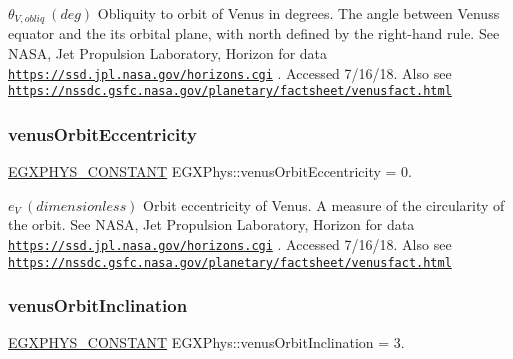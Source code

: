 $ \theta_{V,obliq} \ (deg)$ Obliquity to orbit of Venus in degrees. The angle between Venus\textquotesingle{}s equator and the it\textquotesingle{}s orbital plane, with north defined by the right-\/hand rule. See N\+A\+SA, Jet Propulsion Laboratory, Horizon for data \href{https://ssd.jpl.nasa.gov/horizons.cgi}{\tt https\+://ssd.\+jpl.\+nasa.\+gov/horizons.\+cgi} . Accessed 7/16/18. Also see \href{https://nssdc.gsfc.nasa.gov/planetary/factsheet/venusfact.html}{\tt https\+://nssdc.\+gsfc.\+nasa.\+gov/planetary/factsheet/venusfact.\+html} \mbox{\label{group___e_g_x_phys-_constants-_astrophysics-_solar_system-_venus-_orbit_ga78f2cdfeba6d640c0dceeb7b83c6b238}} 
\subsubsection{\texorpdfstring{venus\+Orbit\+Eccentricity}{venusOrbitEccentricity}}
{\footnotesize\ttfamily \mbox{\hyperlink{group___e_g_x_phys-_constants-_macros_ga76980d288494ce1714c9ac68a95ba702}{E\+G\+X\+P\+H\+Y\+S\+\_\+\+C\+O\+N\+S\+T\+A\+NT}} E\+G\+X\+Phys\+::venus\+Orbit\+Eccentricity = 0.}

$ e_{V} \ (dimensionless)$ Orbit eccentricity of Venus. A measure of the circularity of the orbit. See N\+A\+SA, Jet Propulsion Laboratory, Horizon for data \href{https://ssd.jpl.nasa.gov/horizons.cgi}{\tt https\+://ssd.\+jpl.\+nasa.\+gov/horizons.\+cgi} . Accessed 7/16/18. Also see \href{https://nssdc.gsfc.nasa.gov/planetary/factsheet/venusfact.html}{\tt https\+://nssdc.\+gsfc.\+nasa.\+gov/planetary/factsheet/venusfact.\+html} \mbox{\label{group___e_g_x_phys-_constants-_astrophysics-_solar_system-_venus-_orbit_ga54de9193ce649348c07a56398161dc6e}} 
\subsubsection{\texorpdfstring{venus\+Orbit\+Inclination}{venusOrbitInclination}}
{\footnotesize\ttfamily \mbox{\hyperlink{group___e_g_x_phys-_constants-_macros_ga76980d288494ce1714c9ac68a95ba702}{E\+G\+X\+P\+H\+Y\+S\+\_\+\+C\+O\+N\+S\+T\+A\+NT}} E\+G\+X\+Phys\+::venus\+Orbit\+Inclination = 3.}

